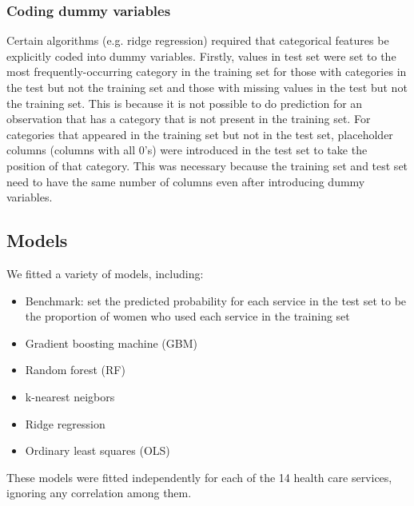 \documentclass{article}\usepackage[]{graphicx}\usepackage[]{color}
\begin{document}
\subsubsection{Coding dummy variables}
Certain algorithms (e.g. ridge regression) required that categorical features be explicitly coded into dummy variables. Firstly, values in test set were set to the most frequently-occurring category in the training set for those with categories in the test but not the training set and those with missing values in the test but not the training set. This is because it is not possible to do prediction for an observation that has a category that is not present in the training set. For categories that appeared in the training set but not in the test set, placeholder columns (columns with all 0's) were introduced in the test set to take the position of that category. This was necessary because the training set and test set need to have the same number of columns even after introducing dummy variables.

\subsection{Models}
We fitted a variety of models, including:                                                                                                                                                                                                                                                                                                                                                                                                                                                                                                                                                                                                \begin{itemize}
\item Benchmark: set the predicted probability for each service in the test set to be the proportion of women who used each service in the training set
 \item Gradient boosting machine (GBM)
 \item Random forest (RF)
 \item k-nearest neigbors
 \item Ridge regression
 \item Ordinary least squares (OLS)
 \end{itemize}

These models were fitted independently for each of the 14 health care services, ignoring any correlation among them.
\end{document}
